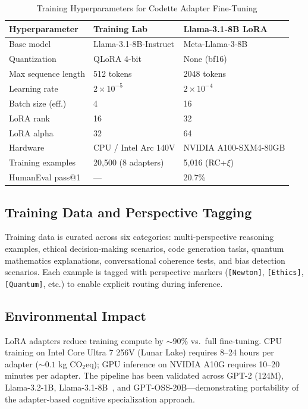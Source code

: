 \documentclass[11pt,a4paper]{article}
\newcommand{\rcxi}{RC+$\xi$}
\begin{document}
\begin{table}[H]
\centering
\caption{Training Hyperparameters for Codette Adapter Fine-Tuning}
\label{tab:hyperparams}
\begin{tabular}{@{}lll@{}}
\toprule
\textbf{Hyperparameter} & \textbf{Training Lab} & \textbf{Llama-3.1-8B LoRA} \\
\midrule
Base model          & Llama-3.1-8B-Instruct & Meta-Llama-3-8B \\
Quantization        & QLoRA 4-bit           & None (bf16) \\
Max sequence length  & 512 tokens            & 2048 tokens \\
Learning rate       & $2 \times 10^{-5}$    & $2 \times 10^{-4}$ \\
Batch size (eff.)   & 4                     & 16 \\
LoRA rank           & 16                    & 32 \\
LoRA alpha          & 32                    & 64 \\
Hardware            & CPU / Intel Arc 140V  & NVIDIA A100-SXM4-80GB \\
Training examples   & 20,500 (8 adapters)   & 5,016 (\rcxi{}) \\
HumanEval pass@1    & ---                   & 20.7\% \\
\bottomrule
\end{tabular}
\end{table}

\subsection{Training Data and Perspective Tagging}
Training data is curated across six categories: multi-perspective reasoning examples, ethical decision-making scenarios, code generation tasks, quantum mathematics explanations, conversational coherence tests, and bias detection scenarios. Each example is tagged with perspective markers (\texttt{[Newton]}, \texttt{[Ethics]}, \texttt{[Quantum]}, etc.) to enable explicit routing during inference.

\subsection{Environmental Impact}
LoRA adapters reduce training compute by ${\sim}90\%$ vs.\ full fine-tuning. CPU training on Intel Core Ultra 7 256V (Lunar Lake) requires 8--24 hours per adapter (${\sim}0.1$ kg CO$_2$eq); GPU inference on NVIDIA A10G requires 10--20 minutes per adapter. The pipeline has been validated across GPT-2 (124M), Llama-3.2-1B, Llama-3.1-8B~\citep{grattafiori2024llama}, and GPT-OSS-20B---demonstrating portability of the adapter-based cognitive specialization approach.
\end{document}
